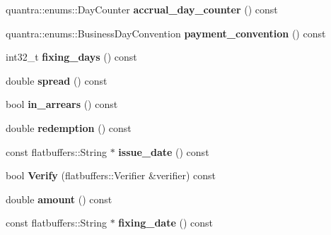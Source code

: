 \begin{DoxyCompactItemize}
quantra\+::enums\+::\+Day\+Counter {\bfseries accrual\+\_\+day\+\_\+counter} () const
\item 
\mbox{\label{structquantra_1_1FLATBUFFERS__FINAL__CLASS_a01ba679cdd14fe10a620e64fe2fae6c2}} 
quantra\+::enums\+::\+Business\+Day\+Convention {\bfseries payment\+\_\+convention} () const
\item 
\mbox{\label{structquantra_1_1FLATBUFFERS__FINAL__CLASS_af545a8a6ad48fc2a0597341e9ae68026}} 
int32\+\_\+t {\bfseries fixing\+\_\+days} () const
\item 
\mbox{\label{structquantra_1_1FLATBUFFERS__FINAL__CLASS_afb98686c8dc5e287d93dfec7139013cd}} 
double {\bfseries spread} () const
\item 
\mbox{\label{structquantra_1_1FLATBUFFERS__FINAL__CLASS_ac05d204966d890512029f077dfdedcba}} 
bool {\bfseries in\+\_\+arrears} () const
\item 
\mbox{\label{structquantra_1_1FLATBUFFERS__FINAL__CLASS_a703292c01b0087fda51cd078d31ca15e}} 
double {\bfseries redemption} () const
\item 
\mbox{\label{structquantra_1_1FLATBUFFERS__FINAL__CLASS_adf3517b162e1be9f52e6c0de30b15ab4}} 
const flatbuffers\+::\+String $\ast$ {\bfseries issue\+\_\+date} () const
\item 
\mbox{\label{structquantra_1_1FLATBUFFERS__FINAL__CLASS_aed693ee5a45b5f53af7411f9cab6793a}} 
bool {\bfseries Verify} (flatbuffers\+::\+Verifier \&verifier) const
\item 
\mbox{\label{structquantra_1_1FLATBUFFERS__FINAL__CLASS_a166da80825220ec9e04580d3aba13aca}} 
double {\bfseries amount} () const
\item 
\mbox{\label{structquantra_1_1FLATBUFFERS__FINAL__CLASS_a39c2480a4a44a603975f828bc3fab419}} 
const flatbuffers\+::\+String $\ast$ {\bfseries fixing\+\_\+date} () const

\end{DoxyCompactItemize}
